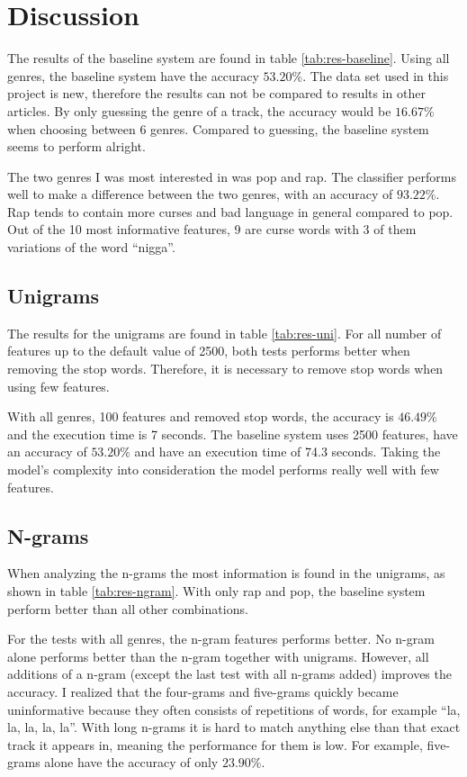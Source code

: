\documentclass[a4paper, 12pt]{article}
\begin{document}
\pagebreak
\section{Discussion}
The results of the baseline system are found in table \ref{tab:res-baseline}.
Using all genres, the baseline system have the accuracy $53.20 \%$.
The data set used in this project is new, therefore the results can not be compared to results in other articles.
By only guessing the genre of a track, the accuracy would be $16.67 \%$ when choosing between 6 genres.
Compared to guessing, the baseline system seems to perform alright.

The two genres I was most interested in was pop and rap.
The classifier performs well to make a difference between the two genres, with an accuracy of $93.22 \%$.
Rap tends to contain more curses and bad language in general compared to pop.
Out of the 10 most informative features, 9 are curse words with 3 of them variations of the word ``nigga''.

\subsection{Unigrams}
The results for the unigrams are found in table \ref{tab:res-uni}.
For all number of features up to the default value of 2500, both tests performs better when removing the stop words.
Therefore, it is necessary to remove stop words when using few features.

With all genres, 100 features and removed stop words, the accuracy is $46.49\%$ and the execution time is 7 seconds.
The baseline system uses 2500 features, have an accuracy of $53.20\%$ and have an execution time of 74.3 seconds.
Taking the model's complexity into consideration the model performs really well with few features.

\subsection{N-grams}
When analyzing the n-grams the most information is found in the unigrams, as shown in table \ref{tab:res-ngram}.
With only rap and pop, the baseline system perform better than all other combinations.

For the tests with all genres, the n-gram features performs better.
No n-gram alone performs better than the n-gram together with unigrams.
However, all additions of a n-gram (except the last test with all n-grams added) improves the accuracy.
I realized that the four-grams and five-grams quickly became uninformative because they often consists of repetitions of words, for example ``la, la, la, la, la''.
With long n-grams it is hard to match anything else than that exact track it appears in, meaning the performance for them is low.
For example, five-grams alone have the accuracy of only $23.90 \%$.
\end{document}
